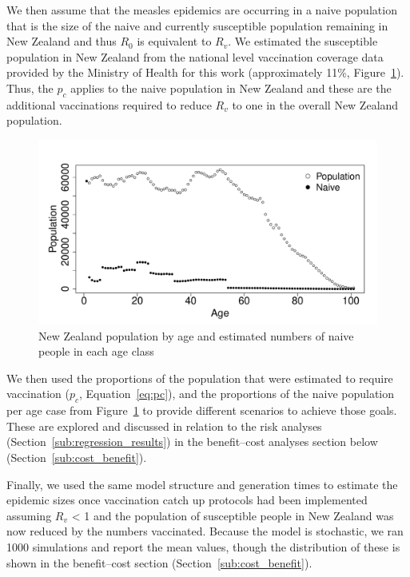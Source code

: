 \documentclass{article}
\begin{document}
We then assume that the measles epidemics are occurring in a naive population that is the size of the naive and currently susceptible population remaining in New Zealand and thus $R_0$ is equivalent to $R_v$. We estimated the susceptible population in New Zealand from the national level vaccination coverage data provided by the Ministry of Health for this work (approximately 11\%, Figure~\ref{fig:naive}). Thus, the $p_c$ applies to the naive population in New Zealand and these are the additional vaccinations required to reduce $R_v$ to one in the overall New Zealand population.


\begin{figure}[ht!]
\begin{center}
\includegraphics{draftfinalreport-039}
\end{center}
\caption{New Zealand population by age and estimated numbers of naive people in each age class}
\label{fig:naive}
\end{figure}

We then used the proportions of the population that were estimated to require vaccination ($p_c$, Equation~\ref{eq:pc}), and the proportions of the naive population per age case from Figure~\ref{fig:naive} to provide different scenarios to achieve those goals. These are explored and discussed in relation to the risk analyses (Section~\ref{sub:regression_results}) in the benefit--cost analyses section below (Section~\ref{sub:cost_benefit}).

Finally, we used the same model structure and generation times to estimate the epidemic sizes once vaccination catch up protocols had been implemented assuming $R_v$ < 1 and the population of susceptible people in New Zealand was now reduced by the numbers vaccinated. Because the model is stochastic, we ran 1000 simulations and report the mean values, though the distribution of these is shown in the benefit--cost section (Section~\ref{sub:cost_benefit}).
\end{document}
